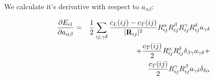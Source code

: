We calculate it's derivative with respect to $a_{\alpha\beta}$:

\begin{eqnarray}
\frac{\partial E_{el}}{\partial a_{\alpha\beta}}&=& \frac{1}{2}\sum_{ij,\gamma\delta} \frac{c_L(ij)-c_T(ij)}{|\mathbf R_{ij}|^2} 
R_{ij}^{\alpha}R_{ij}^{\beta}R_{ij}^{\gamma}R_{ij}^{\delta}
a_{\gamma\delta} \nonumber \\
&& +    \frac{c_T(ij)}{2} R_{ij}^{\alpha}R_{ij}^{\delta}
 \delta_{\beta\gamma} a_{\gamma\delta} + \nonumber \\
&& \frac{c_T(ij)}{2} R_{ij}^{\gamma} R_{ij}^{\beta}
a_{\gamma\delta} \delta_{\delta\alpha} 
\end{eqnarray}









